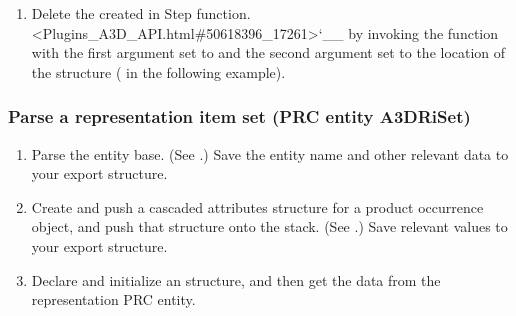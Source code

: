 \documentclass[letterpaper,12pt,english,openany,oneside]{sphinxmanual}
\begin{document}
\begin{sphinxVerbatim}[commandchars=\\\{\}]
\end{sphinxVerbatim}
\begin{enumerate}
%
\setcounter{enumi}{7}
\item {} 
Delete the  created in Step  function. <Plugins\_A3D\_API.html\#50618396\_17261>`\_\_ by invoking the  function with the first argument set to  and the second argument set to the location of the structure ( in the following example).

\end{enumerate}

\begin{sphinxVerbatim}[commandchars=\\\{\}]
 
\end{sphinxVerbatim}


\subsubsection{Parse a representation item set (PRC entity A3DRiSet)}
\label{\detokenize{Plugins_A3D_API:parse-a-representation-item-set-prc-entity-a3driset}}\begin{enumerate}
%
\item {} 
Parse the entity base. (See .) Save the entity name and other relevant data to your export structure.

\item {} 
Create and push a cascaded attributes structure for a product occurrence object, and push that structure onto the stack. (See .) Save relevant values to your export structure.

\item {} 
Declare and initialize an  structure, and then get the data from the representation PRC entity.

\end{enumerate}
\end{document}
